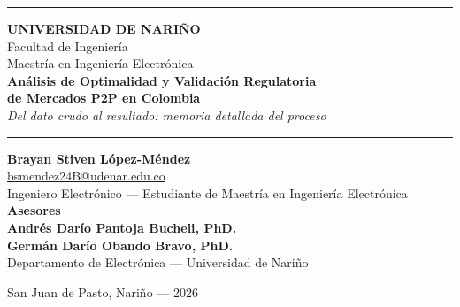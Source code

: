 \documentclass[12pt]{article}
\numberwithin{figure}{section}
\numberwithin{table}{section}
\numberwithin{equation}{section}
\begin{document}
\sloppy
\justifying

\thispagestyle{empty}
\begin{titlepage}
    \centering
    \vspace*{0.1cm}
    {\color{black}\rule{\textwidth}{2pt}\par}
    \vspace{0.6cm}
    {\large\textbf{UNIVERSIDAD DE NARIÑO}}\\[0.2em]
    {\normalsize Facultad de Ingeniería\\
     Maestría en Ingeniería Electrónica}\\[1.4cm]

    {\Large\textbf{Análisis de Optimalidad y Validación Regulatoria}}\\[0.35em]
    {\Large\textbf{de Mercados P2P en Colombia}}\\[0.9cm]

    {\large\itshape Del dato crudo al resultado: memoria detallada del proceso}\\[0.4cm]
    {\color{black}\rule{0.6\textwidth}{0.6pt}\par}

    \vfill

    {\large\textbf{Brayan Stiven López-Méndez}}\\
    \url{bsmendez24B@udenar.edu.co}\\
    Ingeniero Electrónico --- Estudiante de Maestría en Ingeniería Electrónica\\[1.0cm]

    {\normalsize\textbf{Asesores}}\\[0.3em]
    {\large\textbf{Andrés Darío Pantoja Bucheli, PhD.}}\\
    {\large\textbf{Germán Darío Obando Bravo, PhD.}}\\
    Departamento de Electrónica --- Universidad de Nariño

    \vspace{1.2cm}
    {\normalsize San Juan de Pasto, Nariño --- 2026}
    \vspace{0.6cm}
\end{titlepage}

\newpage
{}

\renewcommand{\contentsname}{\Huge\textbf{Índice general}\vspace{-0.1cm}}
\renewcommand{\listfigurename}{\Huge\textbf{Índice de figuras}\vspace{-0.1cm}}
\renewcommand{\listtablename}{\Huge\textbf{Índice de tablas}\vspace{-0.1cm}}
\end{document}
